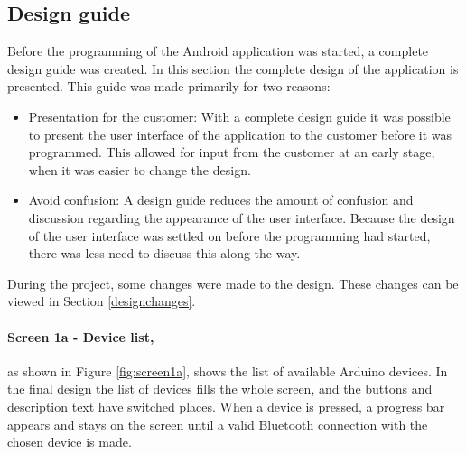 \subsection{Design guide}
\label{sec:design-guide}
Before the programming of the Android application was started, a complete design guide was created. In this section the complete design of the application is presented. This guide was made primarily for two reasons:\\
\begin{itemize}
	\item{Presentation for the customer:} With a complete design guide it was possible to present the user interface of the application to the customer before it was programmed. This allowed for input from the customer at an early stage, when it was easier to change the design.
	\item{Avoid confusion:} A design guide reduces the amount of confusion and discussion regarding the appearance of the user interface. Because the design of the user interface was settled on before the programming had started, there was less need to discuss this along the way.
\end{itemize}
\vspace{6 mm}
During the project, some changes were made to the design. These changes can be viewed in Section \ref{designchanges}.

\paragraph{Screen 1a - Device list,} as shown in Figure \ref{fig:screen1a}, shows the list of available Arduino devices. In the final design the list of devices fills the whole screen, and the buttons and description text have switched places. When a device is pressed, a progress bar appears and stays on the screen until a valid Bluetooth connection with the chosen device is made.

